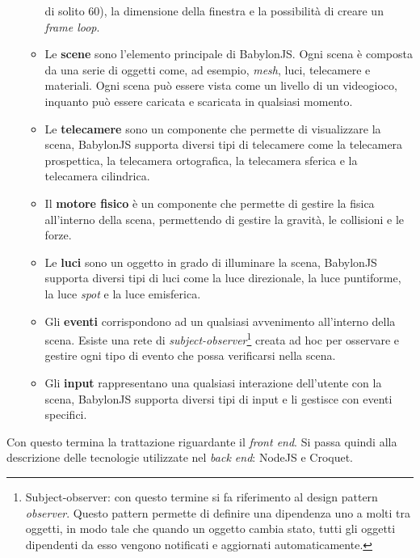 \begin{itemize}
\begin{itemize}
        di solito 60), la dimensione della finestra e la possibilità di creare un \textit{frame loop}.
        \item Le \textbf{scene} sono l'elemento principale di BabylonJS. Ogni scena è composta da una serie di oggetti come, ad esempio, \textit{mesh}, luci, telecamere e materiali. Ogni scena
        può essere vista come un livello di un videogioco, inquanto può essere caricata e scaricata in qualsiasi momento.
        \item Le \textbf{telecamere} sono un componente che permette di visualizzare la scena, BabylonJS supporta diversi tipi di telecamere come la telecamera prospettica, la telecamera ortografica,
        la telecamera sferica e la telecamera cilindrica.
        \item Il \textbf{motore fisico} è un componente che permette di gestire la fisica all'interno della scena, permettendo di gestire la gravità, le collisioni e le forze.
        \item Le \textbf{luci} sono un oggetto in grado di illuminare la scena, BabylonJS supporta diversi tipi di luci come la luce direzionale, la luce puntiforme, la luce 
        \textit{spot} e la luce emisferica.
        \item Gli \textbf{eventi} corrispondono ad un qualsiasi avvenimento all'interno della scena. Esiste una rete di \textit{subject-observer}\footnote{
            Subject-observer: con questo termine si fa riferimento al design pattern \textit{observer}. Questo pattern permette di definire una dipendenza uno a molti tra oggetti,
            in modo tale che quando un oggetto cambia stato, tutti gli oggetti dipendenti da esso vengono notificati e aggiornati automaticamente.
        } creata ad hoc per osservare e gestire ogni tipo di evento che possa verificarsi nella scena.
        \item Gli \textbf{input} rappresentano una qualsiasi interazione dell'utente con la scena, BabylonJS supporta diversi tipi di input e li gestisce con eventi specifici.
    \end{itemize}
\end{itemize}
Con questo termina la trattazione riguardante il \textit{front end}. Si passa quindi alla descrizione delle tecnologie utilizzate nel \textit{back end}: NodeJS e Croquet.


